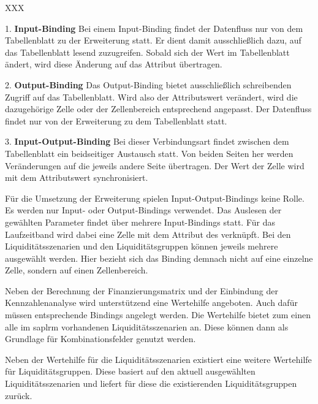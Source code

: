 \begin{onehalfspacing}
\begin{seToplist}{ XXX }

\item[1.] \textbf{Input-Binding} \newline
Bei einem Input-Binding findet der Datenfluss nur von dem Tabellenblatt zu der Erweiterung statt. Er dient damit ausschließlich dazu, auf das Tabellenblatt lesend zuzugreifen. Sobald sich der Wert im Tabellenblatt ändert, wird diese Änderung auf das Attribut übertragen.

\item[2.] \textbf{Output-Binding} \newline
Das Output-Binding bietet ausschließlich schreibenden Zugriff auf das Tabellenblatt. Wird also der Attributswert verändert, wird die dazugehörige Zelle oder der Zellenbereich entsprechend angepasst. Der Datenfluss findet nur von der Erweiterung zu dem Tabellenblatt statt.

\item[3.] \textbf{Input-Output-Binding} \newline
Bei dieser Verbindungsart findet zwischen dem Tabellenblatt ein beidseitiger Austausch statt. Von beiden Seiten her werden Veränderungen auf die jeweils andere Seite übertragen. Der Wert der Zelle wird mit dem Attributswert synchronisiert.

\end{seToplist}

Für die Umsetzung der Erweiterung spielen Input-Output-Bindings keine Rolle. Es werden nur Input- oder Output-Bindings verwendet. Das Auslesen der gewählten Parameter findet über mehrere Input-Bindings statt. Für das Laufzeitband wird dabei eine Zelle mit dem Attribut  des  verknüpft. Bei den Liquiditätsszenarien und den Liquiditätsgruppen können jeweils mehrere ausgewählt werden. Hier bezieht sich das Binding demnach nicht auf eine einzelne Zelle, sondern auf einen Zellenbereich.

Neben der Berechnung der Finanzierungsmatrix und der Einbindung der Kennzahlenanalyse wird unterstützend eine Wertehilfe angeboten. Auch dafür müssen entsprechende Bindings angelegt werden. Die Wertehilfe bietet zum einen alle im \gls{saplrm} vorhandenen Liquiditätsszenarien an. Diese können dann als Grundlage für Kombinationsfelder genutzt werden.

Neben der Wertehilfe für die Liquiditätsszenarien existiert eine weitere Wertehilfe für Liquiditätsgruppen. Diese basiert auf den aktuell ausgewählten Liquiditätsszenarien und liefert für diese die existierenden Liquiditätsgruppen zurück.


\end{onehalfspacing}
